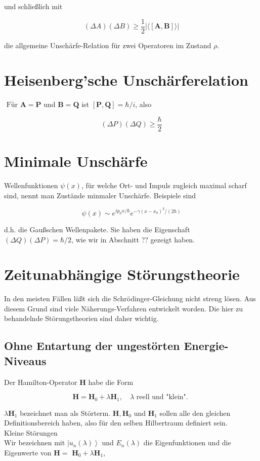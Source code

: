 \documentclass[10pt, letterpaper]{article}
\begin{document}
und schließlich mit

$$
(\Delta A)(\Delta B) \geq \frac{1}{2}|\langle[\mathbf{A}, \mathbf{B}]\rangle|
$$

die allgemeine Unschärfe-Relation für zwei Operatoren im Zustand $\rho$.

\section*{Heisenberg'sche Unschärferelation}
$\overline{\text { Für }} \mathbf{A}=\mathbf{P}$ und $\mathbf{B}=\mathbf{Q}$ ist $[\mathbf{P}, \mathbf{Q}]=\hbar / i$, also

$$
(\Delta P)(\Delta Q) \geq \frac{\hbar}{2}
$$

\section*{Minimale Unschärfe}
Wellenfunktionen $\psi(x)$, für welche Ort- und Impuls zugleich maximal scharf sind, nennt man Zustände minmaler Unschärfe. Beispiele sind

$$
\psi(x) \sim e^{i p_{0} x / \hbar} e^{-\gamma\left(x-x_{0}\right)^{2} /(2 \hbar)}
$$

d.h. die Gaußschen Wellenpakete. Sie haben die Eigenschaft $(\Delta Q)(\Delta P)=\hbar / 2$, wie wir in Abschnitt ?? gezeigt haben.


\pagebreak


\section{Zeitunabhängige Störungstheorie}

In den meisten Fällen läßt sich die Schrödinger-Gleichung nicht streng lösen. Aus diesem Grund sind viele Näherungs-Verfahren entwickelt worden. Die hier zu behandelnde Störungstheorien sind daher wichtig.

\subsection*{Ohne Entartung der ungestörten Energie-Niveaus}
Der Hamilton-Operator $\mathbf{H}$ habe die Form

$$
\mathbf{H}=\mathbf{H}_{0}+\lambda \mathbf{H}_{1}, \quad \lambda \text { reell und "klein". }
$$

$\lambda \mathbf{H}_{1}$ bezeichnet man als Störterm. $\mathbf{H}, \mathbf{H}_{0}$ und $\mathbf{H}_{1}$ sollen alle den gleichen Definitionsbereich haben, also für den selben Hilbertraum definiert sein.\\
Kleine Störungen\\
Wir bezeichnen mit $\left|u_{n}(\lambda)\right\rangle$ und $E_{n}(\lambda)$ die Eigenfunktionen und die Eigenwerte von $\mathbf{H}=$ $\mathbf{H}_{0}+\lambda \mathbf{H}_{1}$,
\end{document}
